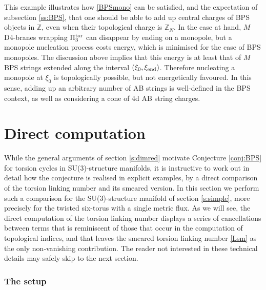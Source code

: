 \documentclass[11pt]{article}
\newcommand{\IZ}{\mathbb{Z}}
\begin{document}
This example illustrates how \eqref{BPSmono} can be satisfied, and the expectation of subsection \ref{ss:BPS}, that one should be able to add up central charges of BPS objects in $\IZ$, even when their topological charge is $\IZ_N$. In the case at hand, $M$ D4-branes wrapping $\Pi_3^{\rm tor}$ can disappear by ending on a monopole, but a monopole nucleation process costs  energy, which is minimised for the case of BPS monopoles. The discussion above implies that this energy is at least that of $M$ BPS strings extended along the interval $(\xi_0, \xi_{\rm end})$. Therefore nucleating a monopole at $\xi_0$ is topologically possible, but not energetically favoured. In this sense, adding up an arbitrary number of  AB strings is well-defined in the BPS context, as well as considering a cone of 4d AB string charges. 


 


\section{Direct computation}
\label{s:direct}

While the general arguments of section \ref{s:dimred} motivate Conjecture \ref{conj:BPS} for torsion cycles in SU(3)-structure manifolds, it is instructive to work out in detail how the conjecture is realised in explicit examples, by a direct comparison of the torsion linking number and its smeared version. In this section we perform such a comparison for the SU(3)-structure manifold of section \ref{s:simple}, more precisely for the twisted six-torus with a single metric flux. As we will see, the direct computation of the torsion linking number displays a series of cancellations between terms that is reminiscent of those that occur in the computation of topological indices, and that leaves the smeared torsion linking number \eqref{Lsm} as the only non-vanishing contribution. The reader not interested in these technical details may safely skip to the next section. 


\subsubsection*{The setup}
\end{document}
